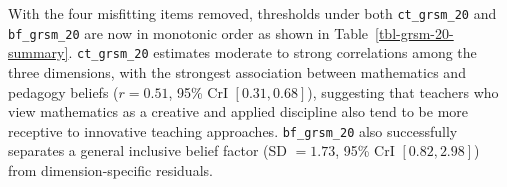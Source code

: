 \documentclass[
  man,
  floatsintext,
  longtable,
  nolmodern,
  notxfonts,
  notimes,
  colorlinks=true,linkcolor=blue,citecolor=blue,urlcolor=blue]{apa7}
\begin{document}
With the four misfitting items removed, thresholds under both
\texttt{ct\_grsm\_20} and \texttt{bf\_grsm\_20} are now in monotonic
order as shown in Table~\ref{tbl-grsm-20-summary}. \texttt{ct\_grsm\_20}
estimates moderate to strong correlations among the three dimensions,
with the strongest association between mathematics and pedagogy beliefs
(\(r = 0.51\), 95\% CrI \([0.31, 0.68]\)), suggesting that teachers who
view mathematics as a creative and applied discipline also tend to be
more receptive to innovative teaching approaches. \texttt{bf\_grsm\_20}
also successfully separates a general inclusive belief factor (SD
\(= 1.73\), 95\% CrI \([0.82, 2.98]\)) from dimension-specific
residuals.

\begin{table}

{\caption{{Parameter estimates from the two GRSM models fitted to the
20-item dataset. Person parameter SDs and correlations are reported for
the correlated-traits and bi-factor structures respectively. Thresholds
are population-level intercepts on the adjacent-category logit
scale.}{\label{tbl-grsm-20-summary}}}
\vspace{-20pt}}


\end{table}
\end{document}
